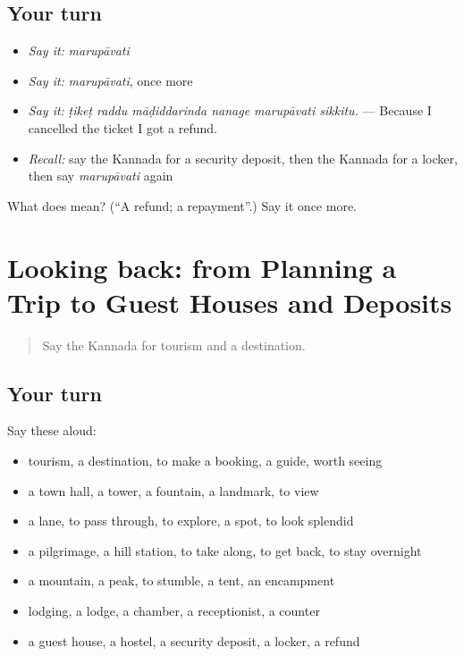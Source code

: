 \subsection*{Your turn}
\begin{itemize}
\raggedright
  \item \emph{Say it:} \emph{marupāvati}
  \item \emph{Say it:} \emph{marupāvati}, once more
  \item \emph{Say it:} \emph{ṭikeṭ raddu māḍiddarinda nanage marupāvati sikkitu.} — Because I cancelled the ticket I got a refund.
  \item \emph{Recall:} say the Kannada for a security deposit, then the Kannada for a locker, then say \emph{marupāvati} again
\end{itemize}

\begin{tcolorbox}[breakable,colback=teal!4,colframe=teal!35!black,title={Before you move on}]
What does  mean? (\textquotedblleft{}A refund; a repayment\textquotedblright{}.) Say it once more.
\end{tcolorbox}
\section[(dialogue)]{Looking back: from Planning a Trip to Guest Houses and Deposits}

\label{lesson:KA-R461-review-455-461}



\begin{quote}
Say the Kannada for tourism and a destination.
\end{quote}

\subsection*{Your turn}
Say these aloud:

\begin{itemize}
\raggedright
  \item tourism, a destination, to make a booking, a guide, worth seeing
  \item a town hall, a tower, a fountain, a landmark, to view
  \item a lane, to pass through, to explore, a spot, to look splendid
  \item a pilgrimage, a hill station, to take along, to get back, to stay overnight
  \item a mountain, a peak, to stumble, a tent, an encampment
  \item lodging, a lodge, a chamber, a receptionist, a counter
  \item a guest house, a hostel, a security deposit, a locker, a refund
\end{itemize}

